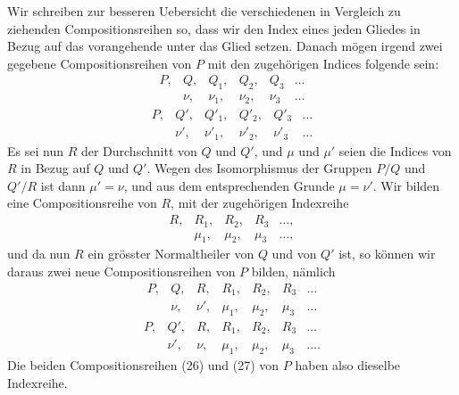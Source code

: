 \documentclass[11pt]{article}
\begin{document}
Wir schreiben zur besseren Uebersicht die verschiedenen in Vergleich zu ziehenden Compositionsreihen so, dass wir den Index eines jeden Gliedes in Bezug auf das vorangehende unter das Glied setzen. Danach mögen irgend zwei gegebene Compositionsreihen von $P$ mit den zugehörigen Indices folgende sein:
\begin{equation}
\begin{array}{cccccc}
P,&Q,&Q_1,&Q_2,&Q_3&\ldots\\
&\nu,&\nu_1,&\nu_2,&\nu_3&\ldots
\end{array}
\tag{23}
\end{equation}
\begin{equation}
\begin{array}{cccccc}
P,&Q',&Q'_1,&Q'_2,&Q'_3&\ldots\\
&\nu',&\nu'_1,&\nu'_2,&\nu'_3&\ldots
\end{array}
\tag{24}
\end{equation}
Es sei nun $R$ der Durchschnitt von $Q$ und $Q'$, und $\mu$ und $\mu'$ seien die Indices von $R$ in Bezug auf $Q$ und $Q'$. Wegen des Isomorphismus der Gruppen $P/Q$ und $Q'/R$ ist dann $\mu'=\nu$, und aus dem entsprechenden Grunde $\mu=\nu'$. Wir bilden eine Compositionsreihe von $R$, mit der zugehörigen Indexreihe
\begin{equation}
\begin{array}{ccccc}
R,&R_1,&R_2,&R_3&\ldots,\\
&\mu_1,&\mu_2,&\mu_3&\ldots,
\end{array}
\tag{25}
\end{equation}
und da nun $R$ ein grösster Normaltheiler von $Q$ und von $Q'$ ist, so können wir daraus zwei neue Compositionsreihen von $P$ bilden, nämlich
\begin{equation}
\begin{array}{ccccccc}
P,&Q,&R,&R_1,&R_2,&R_3&\ldots\\
&\nu,&\nu',&\mu_1,&\mu_2,&\mu_3&\ldots
\end{array}
\tag{26}
\end{equation}
\begin{equation}
\begin{array}{ccccccc}
P,&Q',&R,&R_1,&R_2,&R_3&\ldots\\
&\nu',&\nu,&\mu_1,&\mu_2,&\mu_3&\ldots.
\end{array}
\tag{27}
\end{equation}
Die beiden Compositionsreihen (26) und (27) von $P$ haben also dieselbe Indexreihe.
\end{document}
